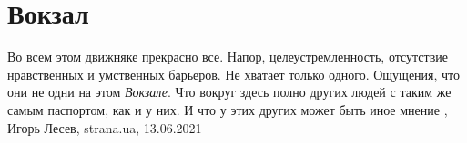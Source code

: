  
 
 
 
 
\chapter{Вокзал}

Во всем этом движняке прекрасно все. Напор, целеустремленность, отсутствие
нравственных и умственных барьеров. Не хватает только одного. Ощущения, что они
не одни на этом \emph{Вокзале}. Что вокруг здесь полно других людей с таким же
самым паспортом, как и у них. И что у этих других может быть иное мнение
, 
Игорь Лесев, strana.ua, 13.06.2021

